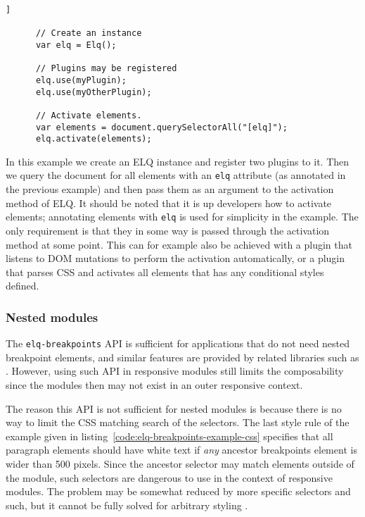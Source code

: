 \documentclass{acm_proc_article-sp}
\newcommand{\code}[1]{\texttt{#1}}
\newcommand{\elq}{ELQ}
\begin{document}
    \begin{lstlisting}[gobble=6,caption={}]]

      // Create an instance
      var elq = Elq();

      // Plugins may be registered
      elq.use(myPlugin);
      elq.use(myOtherPlugin);

      // Activate elements.
      var elements = document.querySelectorAll("[elq]");
      elq.activate(elements);

    \end{lstlisting}

    In this example we create an \elq{} instance and register two plugins to it.
    Then we query the document for all elements with an \code{elq} attribute (as annotated in the previous example) and then pass them as an argument to the activation method of \elq{}.
    It should be noted that it is up developers how to activate elements; annotating elements with \code{elq} is used for simplicity in the example.
    The only requirement is that they in some way is passed through the activation method at some point.
    This can for example also be achieved with a plugin that listens to DOM mutations to perform the activation automatically, or a plugin that parses CSS and activates all elements that has any conditional styles defined.

    \subsubsection{Nested modules}
      The \code{elq-breakpoints} API is sufficient for applications that do not need nested breakpoint elements, and similar features are provided by related libraries such as \cite{eq_imp_eqjs,eq_imp_responsive-elements-2}.
      However, using such API in responsive modules still limits the composability since the modules then may not exist in an outer responsive context.

      The reason this API is not sufficient for nested modules is because there is no way to limit the CSS matching search of the selectors.
      The last style rule of the example given in listing~\ref{code:elq-breakpoints-example-css} specifies that all paragraph elements should have white text if \emph{any} ancestor breakpoints element is wider than 500 pixels.
      Since the ancestor selector may match elements outside of the module, such selectors are dangerous to use in the context of responsive modules.
      The problem may be somewhat reduced by more specific selectors and such, but it cannot be fully solved for arbitrary styling \cite{elq-thesis}.
\end{document}
